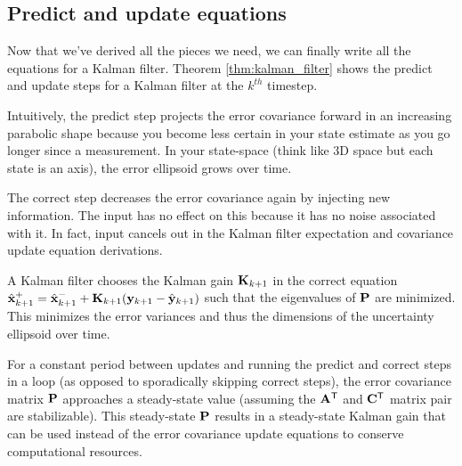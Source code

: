 \subsection{Predict and update equations}

Now that we've derived all the pieces we need, we can finally write all the
equations for a Kalman filter. Theorem \ref{thm:kalman_filter} shows the predict
and update steps for a Kalman filter at the $k^{th}$ timestep.

Intuitively, the predict step projects the error covariance forward in an
increasing parabolic shape because you become less certain in your state
estimate as you go longer since a measurement. In your state-space (think like
3D space but each state is an axis), the error ellipsoid grows over time.

The correct step decreases the error covariance again by injecting new
information. The input has no effect on this because it has no noise associated
with it. In fact, input cancels out in the Kalman filter expectation and
covariance update equation derivations.

A Kalman filter chooses the Kalman gain $\mathbf{K}_{k+1}$ in the correct equation
$\hat{\mathbf{x}}_{k+1}^+ = \hat{\mathbf{x}}_{k+1}^- + \mathbf{K}_{k+1}(\mathbf{y}_{k+1} -
\hat{\mathbf{y}}_{k+1})$ such that the eigenvalues of $\mathbf{P}$ are minimized. This
minimizes the error variances and thus the dimensions of the uncertainty
ellipsoid over time.

For a constant period between updates and running the predict and correct steps
in a loop (as opposed to sporadically skipping correct steps), the error
covariance matrix $\mathbf{P}$ approaches a steady-state value (assuming the
$\mathbf{A}^\mathsf{T}$ and $\mathbf{C}^\mathsf{T}$ matrix pair are stabilizable). This steady-state
$\mathbf{P}$ results in a steady-state Kalman gain that can be used instead of the
error covariance update equations to conserve computational resources.

